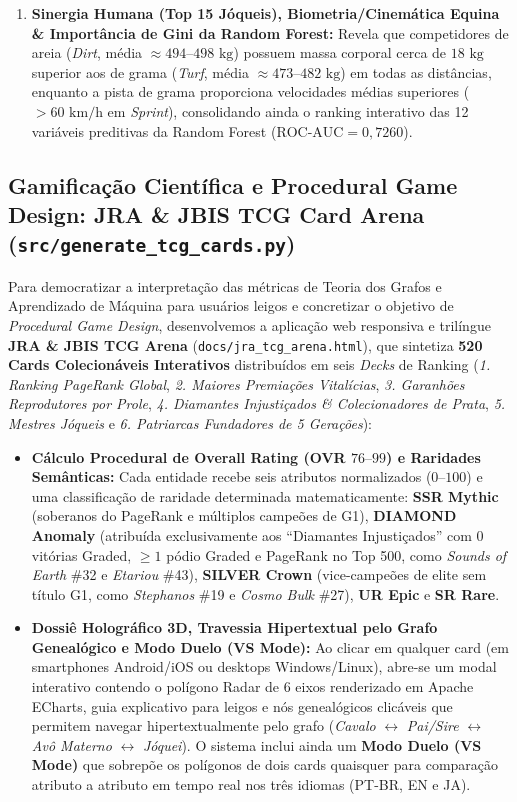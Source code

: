 \documentclass[12pt,a4paper]{article}
\begin{document}
\begin{enumerate}
    \item \textbf{Sinergia Humana (Top 15 Jóqueis), Biometria/Cinemática Equina \& Importância de Gini da Random Forest:} Revela que competidores de areia (\textit{Dirt}, média $\approx 494\text{--}498\text{ kg}$) possuem massa corporal cerca de $18\text{ kg}$ superior aos de grama (\textit{Turf}, média $\approx 473\text{--}482\text{ kg}$) em todas as distâncias, enquanto a pista de grama proporciona velocidades médias superiores ($> 60\text{ km/h}$ em \textit{Sprint}), consolidando ainda o ranking interativo das 12 variáveis preditivas da Random Forest ($\text{ROC-AUC} = 0,7260$).
\end{enumerate}

\subsection{Gamificação Científica e Procedural Game Design: JRA \& JBIS TCG Card Arena (\texttt{src/generate\_tcg\_cards.py})}
Para democratizar a interpretação das métricas de Teoria dos Grafos e Aprendizado de Máquina para usuários leigos e concretizar o objetivo de \textit{Procedural Game Design}, desenvolvemos a aplicação web responsiva e trilíngue \textbf{JRA \& JBIS TCG Arena} (\texttt{docs/jra\_tcg\_arena.html}), que sintetiza \textbf{520 Cards Colecionáveis Interativos} distribuídos em seis \textit{Decks} de Ranking (\textit{1. Ranking PageRank Global}, \textit{2. Maiores Premiações Vitalícias}, \textit{3. Garanhões Reprodutores por Prole}, \textit{4. Diamantes Injustiçados \& Colecionadores de Prata}, \textit{5. Mestres Jóqueis} e \textit{6. Patriarcas Fundadores de 5 Gerações}):
\begin{itemize}
    \item \textbf{Cálculo Procedural de Overall Rating (OVR $76\text{--}99$) e Raridades Semânticas:} Cada entidade recebe seis atributos normalizados ($0\text{--}100$) e uma classificação de raridade determinada matematicamente: \textbf{SSR Mythic} (soberanos do PageRank e múltiplos campeões de G1), \textbf{DIAMOND Anomaly} (atribuída exclusivamente aos ``Diamantes Injustiçados'' com $0$ vitórias Graded, $\ge 1$ pódio Graded e PageRank no Top 500, como \textit{Sounds of Earth} \#32 e \textit{Etariou} \#43), \textbf{SILVER Crown} (vice-campeões de elite sem título G1, como \textit{Stephanos} \#19 e \textit{Cosmo Bulk} \#27), \textbf{UR Epic} e \textbf{SR Rare}.
    \item \textbf{Dossiê Holográfico 3D, Travessia Hipertextual pelo Grafo Genealógico e Modo Duelo (VS Mode):} Ao clicar em qualquer card (em smartphones Android/iOS ou desktops Windows/Linux), abre-se um modal interativo contendo o polígono Radar de 6 eixos renderizado em Apache ECharts, guia explicativo para leigos e nós genealógicos clicáveis que permitem navegar hipertextualmente pelo grafo (\textit{Cavalo} $\leftrightarrow$ \textit{Pai/Sire} $\leftrightarrow$ \textit{Avô Materno} $\leftrightarrow$ \textit{Jóquei}). O sistema inclui ainda um \textbf{Modo Duelo (VS Mode)} que sobrepõe os polígonos de dois cards quaisquer para comparação atributo a atributo em tempo real nos três idiomas (PT-BR, EN e JA).
\end{itemize}
\end{document}
